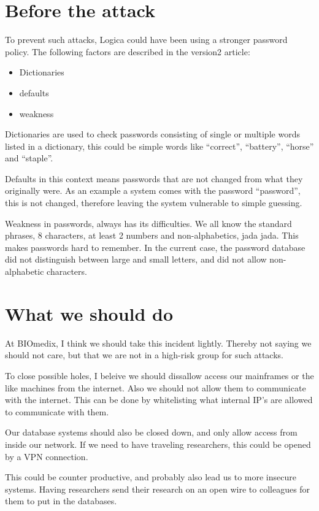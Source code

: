 \documentclass[paper=a4, fontsize=11pt]{scrartcl} %
\numberwithin{equation}{section} %
\numberwithin{figure}{section} %
\numberwithin{table}{section} %
\begin{document}
\section{Before the attack}
To prevent such attacks, Logica could have been using a stronger password
policy. The following factors are described in the version2 article:

\begin{itemize}
\item Dictionaries
\item defaults
\item weakness
\end{itemize}

Dictionaries are used to check passwords consisting of single or multiple words
listed in a dictionary, this could be simple words like ``correct'',
``battery'', ``horse'' and ``staple''. 

Defaults in this context means passwords that are not changed from what they
originally were. As an example a system comes with the password ``password'', 
this is not changed, therefore leaving the system vulnerable to simple
guessing.

Weakness in passwords, always has its difficulties. We all know the standard
phrases, 8 characters, at least 2 numbers and non-alphabetics, jada jada. This
makes passwords hard to remember. In the current case, the password database
did not distinguish between large and small letters, and did not allow
non-alphabetic characters.

\section{What we should do}
At BIOmedix, I think we should take this incident lightly. Thereby not saying
we should not care, but that we are not in a high-risk group for such attacks.

To close possible holes, I beleive we should dissallow access our mainframes or
the like machines from the internet. Also we should not allow them to
communicate with the internet. This can be done by whitelisting what internal
IP's are allowed to communicate with them.

Our database systems should also be closed down, and only allow access from
inside our network. If we need to have traveling researchers, this could be
opened by a VPN connection.

This could be counter productive, and probably also lead us to more insecure
systems. Having researchers send their research on an open wire to colleagues
for them to put in the databases.
\end{document}

